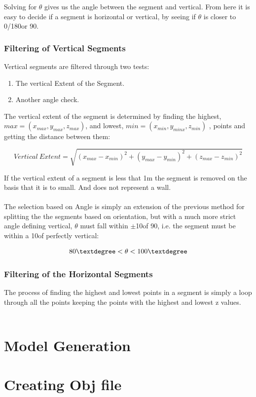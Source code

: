 			
			Solving for $\theta$ gives us the angle between the segment and vertical. From here it is easy to decide if a segment is horizontal or vertical, by seeing if $\theta$ is closer to 0\textdegree/180\textdegree or 90\textdegree.
			
		\subsubsection{Filtering of Vertical Segments}
		
			Vertical segments are filtered through two tests:
			\begin{enumerate}
				\item The vertical Extent of the Segment.
				
				\item Another angle check.
			\end{enumerate}
			 
			The vertical extent of the segment is determined by finding the highest, $max = (x_{max},y_{max},z_{max})$, and lowest, $min = (x_{min},y_{minx},z_{min})$ , points and getting the distance between them:
			
			\begin{equation}
			Vertical \: Extent = \sqrt{(x_{max} - x_{min})^2+(y_{max} - y_{min})^2+(z_{max} - z_{min})^2}
			\end{equation}
			
			If the vertical extent of a segment is less that 1m the segment is removed on the basis that it is to small. And does not represent a wall.\\
			\\
			
			The selection based on Angle is simply an extension of the previous method for splitting the the segments based on orientation, but with a much more strict angle defining vertical, $\theta$ must fall within $\pm$10\textdegree of 90\textdegree, i.e. the segment must be within a 10\textdegree of perfectly vertical:
			
			\begin{equation}
			80\textdegree < \theta < 100\textdegree
			\end{equation}
			
			
			\subsubsection{Filtering of the Horizontal Segments}
			
			The process of finding the highest and lowest points in a segment is simply a loop through all the points keeping the points with the highest and lowest z values.\\
			\\

			
			
	\section{Model Generation}
	
	
	
	
	\section{Creating Obj file}
			
					

